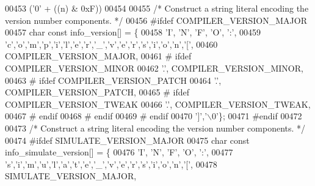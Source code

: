 \begin{DoxyCode}
{{{{{{{{{{{{{{{{{{{{{{{{{{{{{{{{{{{{{{{{{{{00453 \textcolor{preprocessor}{  ('0' + ((n)     & 0xF))}
00454 
00455 \textcolor{comment}{/* Construct a string literal encoding the version number components. */}
00456 \textcolor{preprocessor}{#ifdef COMPILER\_VERSION\_MAJOR}
00457 \textcolor{keywordtype}{char} \textcolor{keyword}{const} info\_version[] = \{
00458   \textcolor{charliteral}{'I'}, \textcolor{charliteral}{'N'}, \textcolor{charliteral}{'F'}, \textcolor{charliteral}{'O'}, \textcolor{charliteral}{':'},
00459   \textcolor{charliteral}{'c'},\textcolor{charliteral}{'o'},\textcolor{charliteral}{'m'},\textcolor{charliteral}{'p'},\textcolor{charliteral}{'i'},\textcolor{charliteral}{'l'},\textcolor{charliteral}{'e'},\textcolor{charliteral}{'r'},\textcolor{charliteral}{'\_'},\textcolor{charliteral}{'v'},\textcolor{charliteral}{'e'},\textcolor{charliteral}{'r'},\textcolor{charliteral}{'s'},\textcolor{charliteral}{'i'},\textcolor{charliteral}{'o'},\textcolor{charliteral}{'n'},\textcolor{charliteral}{'['},
00460   COMPILER\_VERSION\_MAJOR,
00461 \textcolor{preprocessor}{# ifdef COMPILER\_VERSION\_MINOR}
00462   \textcolor{charliteral}{'.'}, COMPILER\_VERSION\_MINOR,
00463 \textcolor{preprocessor}{#  ifdef COMPILER\_VERSION\_PATCH}
00464    \textcolor{charliteral}{'.'}, COMPILER\_VERSION\_PATCH,
00465 \textcolor{preprocessor}{#   ifdef COMPILER\_VERSION\_TWEAK}
00466     \textcolor{charliteral}{'.'}, COMPILER\_VERSION\_TWEAK,
00467 \textcolor{preprocessor}{#   endif}
00468 \textcolor{preprocessor}{#  endif}
00469 \textcolor{preprocessor}{# endif}
00470   \textcolor{charliteral}{']'},\textcolor{charliteral}{'\(\backslash\)0'}\};
00471 \textcolor{preprocessor}{#endif}
00472 
00473 \textcolor{comment}{/* Construct a string literal encoding the version number components. */}
00474 \textcolor{preprocessor}{#ifdef SIMULATE\_VERSION\_MAJOR}
00475 \textcolor{keywordtype}{char} \textcolor{keyword}{const} info\_simulate\_version[] = \{
00476   \textcolor{charliteral}{'I'}, \textcolor{charliteral}{'N'}, \textcolor{charliteral}{'F'}, \textcolor{charliteral}{'O'}, \textcolor{charliteral}{':'},
00477   \textcolor{charliteral}{'s'},\textcolor{charliteral}{'i'},\textcolor{charliteral}{'m'},\textcolor{charliteral}{'u'},\textcolor{charliteral}{'l'},\textcolor{charliteral}{'a'},\textcolor{charliteral}{'t'},\textcolor{charliteral}{'e'},\textcolor{charliteral}{'\_'},\textcolor{charliteral}{'v'},\textcolor{charliteral}{'e'},\textcolor{charliteral}{'r'},\textcolor{charliteral}{'s'},\textcolor{charliteral}{'i'},\textcolor{charliteral}{'o'},\textcolor{charliteral}{'n'},\textcolor{charliteral}{'['},
00478   SIMULATE\_VERSION\_MAJOR,
}}}}}}}}}}}}}}}}}}}}}}}}}}}}}}}}}}}}}}}}}}}
\end{DoxyCode}
